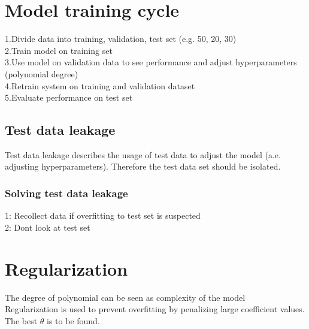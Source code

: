 \documentclass{article}
\begin{document}
\section{Model training cycle}
1.Divide data into training, validation, test set (e.g. 50, 20, 30)\\ 
2.Train model on training set\\
3.Use model on validation data to see performance and adjust hyperparameters (polynomial degree)\\
4.Retrain system on training and validation dataset \\ 
5.Evaluate performance on test set \\
\subsection{Test data leakage}
Test data leakage describes the usage of test data to adjust the model (a.e. adjusting hyperparameters). Therefore the test data set should be isolated.\\
\subsubsection{Solving test data leakage}
1: Recollect data if overfitting to test set is suspected\\
2: Dont look at test set 
\section{Regularization}
The degree of polynomial can be seen as complexity of the model\\
Regularization is used to prevent overfitting by penalizing large coefficient values. \\ 
The best $\theta$ is to be found.
\end{document}
